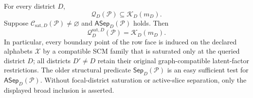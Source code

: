 For every district \(D\),
\[
\mathcal Q_D(\mathcal P)\subseteq\mathcal K_D(m_D).
\]
Suppose \(\mathcal C_{\mathrm{sat},D}(\mathcal P)\ne\varnothing\) and \(\mathsf{ASep}_D(\mathcal P)\) holds. Then
\[
\mathcal Q_D^{\mathrm{sat},D}(\mathcal P)=\mathcal K_D(m_D).
\]
In particular, every boundary point of the row face is induced on the declared alphabets \(\mathcal X\) by a compatible SCM family that is saturated only at the queried district \(D\); all districts \(D'\ne D\) retain their original graph-compatible latent-factor restrictions. The older structural predicate \(\mathsf{Sep}_D(\mathcal P)\) is an easy sufficient test for \(\mathsf{ASep}_D(\mathcal P)\). Without focal-district saturation or active-slice separation, only the displayed broad inclusion is asserted.